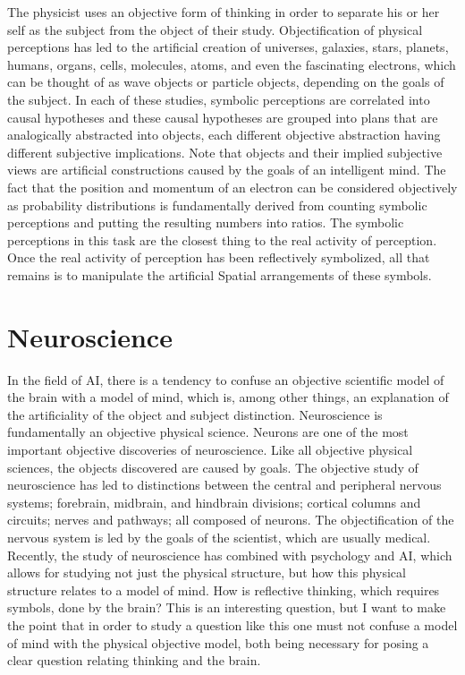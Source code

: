 The physicist uses an objective form of thinking in order to separate
his or her self as the subject from the object of their study.
Objectification of physical perceptions has led to the artificial
creation of universes, galaxies, stars, planets, humans, organs,
cells, molecules, atoms, and even the fascinating electrons, which can
be thought of as wave objects or particle objects, depending on the
goals of the subject.  In each of these studies, symbolic perceptions
are correlated into causal hypotheses and these causal hypotheses are
grouped into plans that are analogically abstracted into objects, each
different objective abstraction having different subjective
implications.  Note that objects and their implied subjective views
are artificial constructions caused by the goals of an intelligent
mind.  The fact that the position and momentum of an electron can be
considered objectively as probability distributions is fundamentally
derived from counting symbolic perceptions and putting the resulting
numbers into ratios.  The symbolic perceptions in this task are the
closest thing to the real activity of perception.  Once the real
activity of perception has been reflectively symbolized, all that
remains is to manipulate the artificial Spatial arrangements of these
symbols.

\section{Neuroscience}

In the field of AI, there is a tendency to confuse an objective
scientific model of the brain with a model of mind, which is, among
other things, an explanation of the artificiality of the object and
subject distinction.  Neuroscience is fundamentally an objective
physical science.  Neurons are one of the most important objective
discoveries of neuroscience.  Like all objective physical sciences,
the objects discovered are caused by goals.  The objective study of
neuroscience has led to distinctions between the central and
peripheral nervous systems; forebrain, midbrain, and hindbrain
divisions; cortical columns and circuits; nerves and pathways; all
composed of neurons.  The objectification of the nervous system is led
by the goals of the scientist, which are usually medical.  Recently,
the study of neuroscience has combined with psychology and AI, which
allows for studying not just the physical structure, but how this
physical structure relates to a model of mind.  How is reflective
thinking, which requires symbols, done by the brain?  This is an
interesting question, but I want to make the point that in order to
study a question like this one must not confuse a model of mind with
the physical objective model, both being necessary for posing a clear
question relating thinking and the brain.

